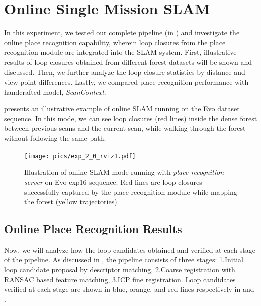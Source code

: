 \section{Online Single Mission SLAM}
\label{sec:exp_online_slam}
In this experiment, we tested our complete pipeline (in ) and investigate the online place recognition capability, wherein loop closures from the place recognition module are integrated into the SLAM system. First, illustrative results of loop closures obtained from different forest datasets will be shown and discussed. Then, we further analyze the loop closure statistics by distance and view point differences. Lastly, we compared place recognition performance with handcrafted model, \emph{ScanContext}. 

 presents an illustrative example of online SLAM running on the Evo dataset sequence. In this mode, we can see loop closures (red lines) inside the dense forest between previous scans and the current scan, while walking through the forest without following the same path. 
\begin{figure}[htbp]
  \centering
  \texttt{[image: pics/exp\_2\_0\_rviz1.pdf]}
  \caption{Illustration of online SLAM mode running with \emph{place recognition server} on Evo exp16 sequence. Red lines are loop closures successfully captured by the place recognition module while mapping the forest (yellow trajectories).}
  \label{fig:exp_2_0_rviz}
\end{figure}



\subsection*{Online Place Recognition Results}
Now, we will analyze how the loop candidates obtained and verified at each stage of the pipeline. As discussed in , the pipeline consists of three stages: 1.Initial loop candidate proposal by descriptor matching, 2.Coarse registration with RANSAC based feature matching, 3.ICP fine registration. Loop candidates verified at each stage are shown in blue, orange, and red lines respectively in  and .

